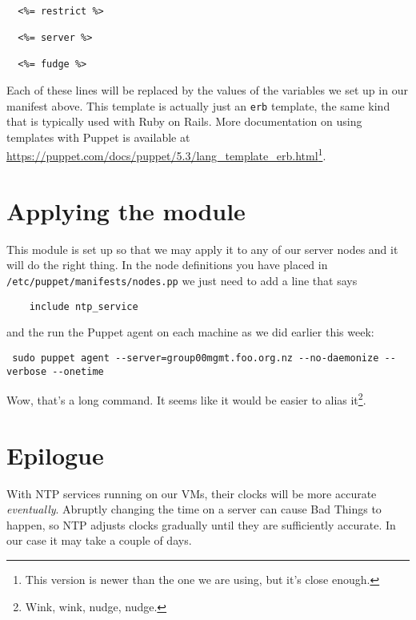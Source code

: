 \documentclass{article}   	%
\begin{document}
\begin{verbatim}

  <%= restrict %>

  <%= server %>

  <%= fudge %>

\end{verbatim}

Each of these lines will be replaced by the values of the variables we set up in our manifest above. This template is actually just an \texttt{erb} template, the same kind that is typically used with Ruby on Rails. More documentation on using templates with Puppet is available at \url{https://puppet.com/docs/puppet/5.3/lang_template_erb.html}\footnote{This version is newer than the one we are using, but it's close enough.}.


\section{Applying the module}
This module is set up so that we may apply it to any of our server nodes and it will do the right thing. In the node definitions you have placed in \texttt{/etc/puppet/manifests/nodes.pp} we just need to add a line that says

\begin{verbatim}
    include ntp_service
\end{verbatim}

and the run the Puppet agent on each machine as we did earlier this week:

\begin{verbatim}
 sudo puppet agent --server=group00mgmt.foo.org.nz --no-daemonize --verbose --onetime
\end{verbatim}

Wow, that's a long command. It seems like it would be easier to alias it\footnote{Wink, wink, nudge, nudge.}.

\section{Epilogue}
With NTP services running on our VMs, their clocks will be more accurate \emph{eventually}. Abruptly changing the time on a server can cause Bad Things to happen, so NTP adjusts clocks gradually until they are sufficiently accurate. In our case it may take a couple of days.
\end{document}
